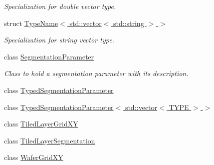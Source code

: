 \begin{DoxyCompactItemize}
\begin{DoxyCompactList}\small\item\em Specialization for double vector type. \item\end{DoxyCompactList}\item 
struct \hyperlink{struct_d_d4hep_1_1_d_d_segmentation_1_1_type_name_3_01std_1_1vector_3_01std_1_1string_01_4_01_4}{TypeName$<$ std::vector$<$ std::string $>$ $>$}
\begin{DoxyCompactList}\small\item\em Specialization for string vector type. \item\end{DoxyCompactList}\item 
class \hyperlink{class_d_d4hep_1_1_d_d_segmentation_1_1_segmentation_parameter}{SegmentationParameter}
\begin{DoxyCompactList}\small\item\em Class to hold a segmentation parameter with its description. \item\end{DoxyCompactList}\item 
class \hyperlink{class_d_d4hep_1_1_d_d_segmentation_1_1_typed_segmentation_parameter}{TypedSegmentationParameter}
\item 
class \hyperlink{class_d_d4hep_1_1_d_d_segmentation_1_1_typed_segmentation_parameter_3_01std_1_1vector_3_01_t_y_p_e_01_4_01_4}{TypedSegmentationParameter$<$ std::vector$<$ TYPE $>$ $>$}
\item 
class \hyperlink{class_d_d4hep_1_1_d_d_segmentation_1_1_tiled_layer_grid_x_y}{TiledLayerGridXY}
\item 
class \hyperlink{class_d_d4hep_1_1_d_d_segmentation_1_1_tiled_layer_segmentation}{TiledLayerSegmentation}
\item 
class \hyperlink{class_d_d4hep_1_1_d_d_segmentation_1_1_wafer_grid_x_y}{WaferGridXY}
\end{DoxyCompactItemize}
